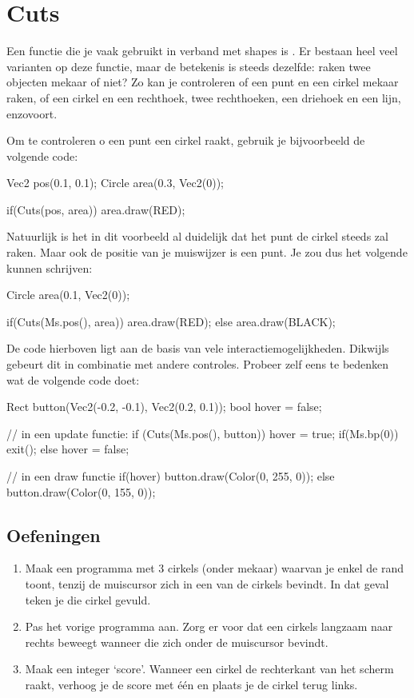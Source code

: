 \section{Cuts}

Een functie die je vaak gebruikt in verband met shapes is . Er bestaan heel veel varianten op deze functie, maar de betekenis is steeds dezelfde: raken twee objecten mekaar of niet? Zo kan je controleren of een punt en een cirkel mekaar raken, of een cirkel en een rechthoek, twee rechthoeken, een driehoek en een lijn, enzovoort.

Om te controleren o een punt een cirkel raakt, gebruik je bijvoorbeeld de volgende code:

\begin{code}
Vec2 pos(0.1, 0.1);
Circle area(0.3, Vec2(0));

if(Cuts(pos, area)) area.draw(RED);
\end{code}

Natuurlijk is het in dit voorbeeld al duidelijk dat het punt de cirkel steeds zal raken. Maar ook de positie van je muiswijzer is een punt. Je zou dus het volgende kunnen schrijven:

\begin{code}
Circle area(0.1, Vec2(0));

if(Cuts(Ms.pos(), area)) area.draw(RED);
else area.draw(BLACK);
\end{code}

De code hierboven ligt aan de basis van vele interactiemogelijkheden. Dikwijls gebeurt dit in combinatie met andere controles. Probeer zelf eens te bedenken wat de volgende code doet:

\begin{code}
Rect button(Vec2(-0.2, -0.1), Vec2(0.2, 0.1));
bool hover = false;

// in een update functie:
if (Cuts(Ms.pos(), button)) {
  hover = true;
	if(Ms.bp(0)) exit();
} else hover = false;

// in een draw functie
if(hover) {
  button.draw(Color(0, 255, 0));
} else {
  button.draw(Color(0, 155, 0));
}
\end{code}

\subsection{Oefeningen}
\begin{enumerate}
\item Maak een programma met 3 cirkels (onder mekaar) waarvan je enkel de rand toont, tenzij de muiscursor zich in een van de cirkels bevindt. In dat geval teken je die cirkel gevuld.
\item Pas het vorige programma aan. Zorg er voor dat een cirkels langzaam naar rechts beweegt wanneer die zich onder de muiscursor bevindt.
\item Maak een integer `score'. Wanneer een cirkel de rechterkant van het scherm raakt, verhoog je de score met \'e\'en en plaats je de cirkel terug links.
\end{enumerate}

